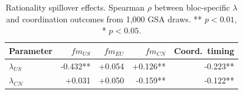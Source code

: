 \begin{table}[htbp]
\centering
\small
\caption{Rationality spillover effects. Spearman $\rho$ between bloc-specific $\lambda$ and coordination outcomes from 1{,}000 GSA draws. ** $p<0.01$, * $p<0.05$.}
\label{tab:lambda_spillover}
\begin{tabular}{lrrrr}
\toprule
\textbf{Parameter} & \textbf{$fm_{US}$} & \textbf{$fm_{EU}$} & \textbf{$fm_{CN}$} & \textbf{Coord.\ timing} \\
\midrule
$\lambda_{US}$ & -0.432** & +0.054 & +0.126** & -0.223** \\
$\lambda_{CN}$ & +0.031 & +0.050 & -0.159** & -0.122** \\
\bottomrule
\end{tabular}
\end{table}